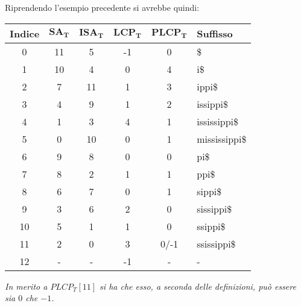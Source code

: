 \begin{esempio}
  Riprendendo l'esempio precedente si avrebbe quindi:
  \begin{table}[H]
    \centering
    \footnotesize
    \begin{tabular}{c|c|c|c|c|l} 
      \textbf{Indice} & $\mathbf{SA_T}$ & $\mathbf{ISA_T}$ & $\mathbf{LCP_T}$
      & $\mathbf{PLCP_T}$ & \textbf{Suffisso}\\  
      \hline
      0 & 11 & 5 & -1 & 0 & \$\\
      1 & 10 & 4 & 0 & 4 & i\$\\
      2 & 7 & 11 & 1 & 3 & ippi\$\\
      3 & 4 & 9 & 1 & 2 & issippi\$\\
      4 & 1 & 3 & 4 & 1 & ississippi\$\\
      5 & 0 & 10 & 0 & 1 & mississippi\$\\
      6 & 9 & 8 & 0 & 0 & pi\$\\
      7 & 8 & 2 & 1 & 1 & ppi\$\\
      8 & 6 & 7 & 0 & 1 & sippi\$\\
      9 & 3 & 6 & 2 & 0 & sissippi\$\\
      10 & 5 & 1 & 1 & 0 & ssippi\$\\
      11 & 2 & 0 & 3 & 0/-1 &  ssissippi\$\\
      12 & - & - & -1 & - & - 
    \end{tabular}
  \end{table}
  \textit{In merito a $PLCP_T[11]$ si ha che esso, a seconda delle definizioni,
    può essere sia $0$ che $-1$.}
\end{esempio}
